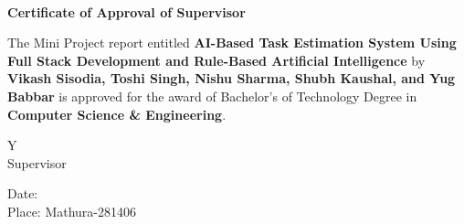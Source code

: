 \newpage
\begin{center}
    \vspace*{0.1cm}
    \\
    \vspace{0.8cm}
    \large
    \textbf{Certificate of Approval of Supervisor}\\
    \vspace{0.5cm}
\end{center}

{\large The Mini Project report entitled \textbf{AI-Based Task Estimation System Using Full Stack Development and Rule-Based Artificial Intelligence} by \textbf{Vikash Sisodia, Toshi Singh, Nishu Sharma, Shubh Kaushal, and Yug Babbar} is approved for the award of Bachelor's of Technology Degree in \textbf{Computer Science \& Engineering}.}
\vspace{2cm}

\begin{table}[H]
\begin{flushright}
\begin{tabular}{Y}
\hrulefill\\
\large Supervisor
\end{tabular}
\end{flushright}
\end{table}

\vspace{1cm}
\begin{flushleft}
{\large Date:}\\
{\large Place: Mathura-281406}
\end{flushleft}
